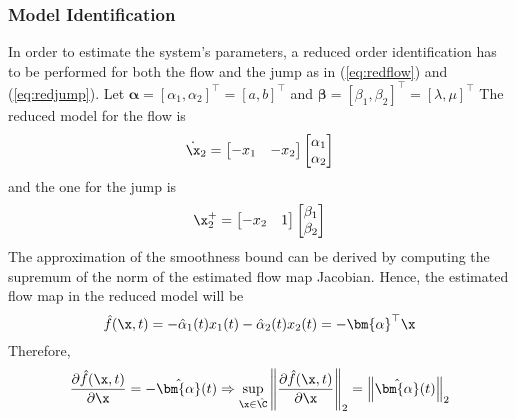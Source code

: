 \subsubsection{Model Identification}
In order to estimate the system's parameters, a reduced order identification has to be performed for both the flow and the jump as in (\ref{eq:redflow}) and (\ref{eq:redjump}). Let $\bm{\alpha} = \left[{\alpha}_1,{\alpha}_2\right]^\top=\left[a,b\right]^\top$ and $\bm{\beta} = \left[{\beta}_1,{\beta}_2\right]^\top = [\lambda,\mu]^\top$
The reduced model for the flow is
%
\begin{equation}
    \dot{\x}_2 = \begin{bmatrix}-x_1&-x_2\end{bmatrix}\begin{bmatrix}{\alpha}_1\\{\alpha}_2\end{bmatrix}
\end{equation}
%
and the one for the jump is
%
\begin{equation}
    \x_2^+ = \begin{bmatrix}-x_2&1\end{bmatrix}\begin{bmatrix}{\beta}_1\\{\beta}_2\end{bmatrix}
\end{equation}
%
The approximation of the  smoothness bound can be derived by computing the supremum of the norm of the estimated flow map Jacobian. Hence, the estimated flow map in the reduced model will be
%
\begin{equation}
    \hat{{f}}(\x,t)=-\hat{{\alpha}}_1(t)x_1(t)-\hat{{\alpha}}_2(t)x_2(t) = -\bm{\alpha}^\top\x
\end{equation}
%
Therefore,
\begin{align*}
	\frac{\partial \hat{{f}}(\x,t)}{\partial \x} = -\hat{\bm{\alpha}}(t)
	\Rightarrow\sup\limits_{\x\in\hat{\C}}\left\|\frac{\partial \hat{{f}}(\x,t)}{\partial\x}\right\|_2 = \left\|\hat{\bm{\alpha}}(t)\right\|_2
\end{align*}
%

